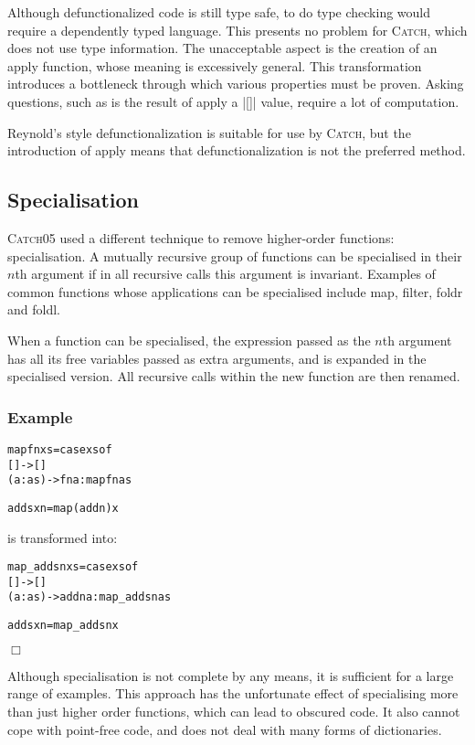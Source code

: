 \documentclass[preprint]{sigplanconf}
\newcommand{\C}[1]{\textsf{#1}}
\newcommand{\catch}{\textsc{Catch}}
\newcounter{exmp}
\newcommand{\yesexample}{\subsubsection*{Example \arabic{exmp}}\addtocounter{exmp}{1}}
\newcommand{\noexample}{\hfill$\Box$}
\newenvironment{code}{\begin{alltt}\small}{\end{alltt}}
\newenvironment{example}{\yesexample}{\noexample}
\begin{document}
Although defunctionalized code is still type safe, to do type checking would require a dependently typed language. This presents no problem for \catch{}, which does not use type information. The unacceptable aspect is the creation of an \C{apply} function, whose meaning is excessively general. This transformation introduces a bottleneck through which various properties must be proven. Asking questions, such as is the result of \C{apply} a |[]| value, require a lot of computation.

Reynold's style defunctionalization is suitable for use by \catch{}, but the introduction of \C{apply} means that defunctionalization is not the preferred method.

\subsection{Specialisation}

\catch05 used a different technique to remove higher-order functions: specialisation. A mutually recursive group of functions can be specialised in their $n$th argument if in all recursive calls this argument is invariant. Examples of common functions whose applications can be specialised include \C{map}, \C{filter}, \C{foldr} and \C{foldl}.

When a function can be specialised, the expression passed as the $n$th argument has all its free variables passed as extra arguments, and is expanded in the specialised version. All recursive calls within the new function are then renamed.

\begin{example}
\begin{code}
map fn xs = case  xs of
                  []      -> []
                  (a:as)  -> fn a : map fn as

adds x n = map (add n) x
\end{code}

\noindent is transformed into:

\begin{code}
map_adds n xs = case  xs of
                      []      -> []
                      (a:as)  -> add n a : map_adds n as

adds x n = map_adds n x
\end{code}
\end{example}

Although specialisation is not complete by any means, it is sufficient for a large range of examples. This approach has the unfortunate effect of specialising more than just higher order functions, which can lead to obscured code. It also cannot cope with point-free code, and does not deal with many forms of dictionaries.
\end{document}
